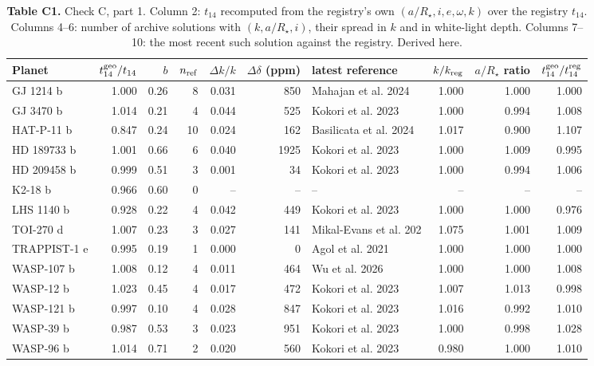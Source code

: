 \begin{table}[H]
\centering\footnotesize
\begin{tabular}{@{}lrrrrrlrrr@{}}
\toprule
\textbf{Planet} & \textbf{$t_{14}^{\rm geo}/t_{14}$} & \textbf{$b$} & \textbf{$n_{\rm ref}$} & \textbf{$\Delta k/k$} & \textbf{$\Delta\delta$ (ppm)} & \textbf{latest reference} & \textbf{$k/k_{\rm reg}$} & \textbf{$a/R_\star$ ratio} & \textbf{$t_{14}^{\rm geo}/t_{14}^{\rm reg}$} \\
\midrule
GJ 1214 b & 1.000 & 0.26 & 8 & 0.031 & 850 & Mahajan et al. 2024 & 1.000 & 1.000 & 1.000 \\
GJ 3470 b & 1.014 & 0.21 & 4 & 0.044 & 525 & Kokori et al. 2023 & 1.000 & 0.994 & 1.008 \\
HAT-P-11 b & 0.847 & 0.24 & 10 & 0.024 & 162 & Basilicata et al. 2024 & 1.017 & 0.900 & 1.107 \\
HD 189733 b & 1.001 & 0.66 & 6 & 0.040 & 1925 & Kokori et al. 2023 & 1.000 & 1.009 & 0.995 \\
HD 209458 b & 0.999 & 0.51 & 3 & 0.001 & 34 & Kokori et al. 2023 & 1.000 & 0.994 & 1.006 \\
K2-18 b & 0.966 & 0.60 & 0 & -- & -- & -- & -- & -- & -- \\
LHS 1140 b & 0.928 & 0.22 & 4 & 0.042 & 449 & Kokori et al. 2023 & 1.000 & 1.000 & 0.976 \\
TOI-270 d & 1.007 & 0.23 & 3 & 0.027 & 141 & Mikal-Evans et al. 202 & 1.075 & 1.001 & 1.009 \\
TRAPPIST-1 e & 0.995 & 0.19 & 1 & 0.000 & 0 & Agol et al. 2021 & 1.000 & 1.000 & 1.000 \\
WASP-107 b & 1.008 & 0.12 & 4 & 0.011 & 464 & Wu et al. 2026 & 1.000 & 1.000 & 1.008 \\
WASP-12 b & 1.023 & 0.45 & 4 & 0.017 & 472 & Kokori et al. 2023 & 1.007 & 1.013 & 0.998 \\
WASP-121 b & 0.997 & 0.10 & 4 & 0.028 & 847 & Kokori et al. 2023 & 1.016 & 0.992 & 1.010 \\
WASP-39 b & 0.987 & 0.53 & 3 & 0.023 & 951 & Kokori et al. 2023 & 1.000 & 0.998 & 1.028 \\
WASP-96 b & 1.014 & 0.71 & 2 & 0.020 & 560 & Kokori et al. 2023 & 0.980 & 1.000 & 1.010 \\
\bottomrule
\end{tabular}
\caption*{\footnotesize\textbf{Table C1.} Check C, part 1. Column 2: $t_{14}$ recomputed from the registry's own $(a/R_\star, i, e, \omega, k)$ over the registry $t_{14}$. Columns 4--6: number of archive solutions with $(k, a/R_\star, i)$, their spread in $k$ and in white-light depth. Columns 7--10: the most recent such solution against the registry. Derived here.}
\end{table}

